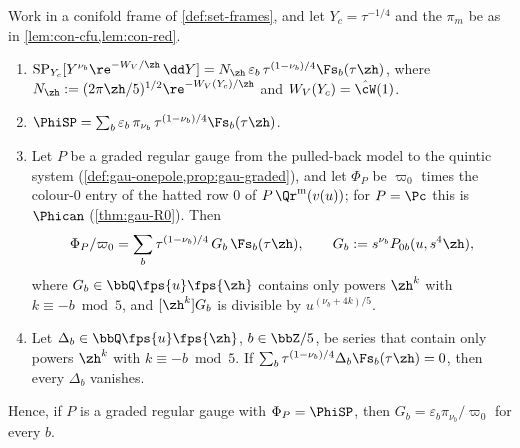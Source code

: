 \begin{lem}
\label{lem:con-id}
Work in a conifold frame of \cref{def:set-frames}, and let $Y_c=\tau^{-1/4}$ and the $\pi_m$ be as in \cref{lem:con-cfu,lem:con-red}.
\begin{enumerate}
\item[(a)] $\mathrm{SP}_{Y_c}[Y^{\nu_b}\re^{-W_V/\zh}\,\dd Y]=N_{\zh}\,\varepsilon_b\,\tau^{(1-\nu_b)/4}\Fs_b(\tau\zh)$, where $N_{\zh}:=(2\pi\zh/5)^{1/2}\re^{-W_V(Y_c)/\zh}$ and $W_V(Y_c)=\hat\cW(1)$.
\item[(b)] $\PhiSP=\sum_b\varepsilon_b\,\pi_{\nu_b}\,\tau^{(1-\nu_b)/4}\Fs_b(\tau\zh)$.
\item[(c)] Let $P$ be a graded regular gauge from the pulled-back model to the quintic system (\cref{def:gau-onepole,prop:gau-graded}), and let $\Phi_P$ be $\varpi_0$ times the colour-$0$ entry of the hatted row $0$ of $P\,\Qr^{\mathrm m}(v(u))$; for $P=\Pc$ this is $\Phican$ (\cref{thm:gau-R0}). Then
\[
\Phi_P/\varpi_0=\sum_b\tau^{(1-\nu_b)/4}\,G_b\,\Fs_b(\tau\zh),\qquad G_b:=s^{\nu_b}P_{0b}(u,s^4\zh),
\]
where $G_b\in\bbQ\fps{u}\fps{\zh}$ contains only powers $\zh^k$ with $k\equiv-b\bmod5$, and $[\zh^k]G_b$ is divisible by $u^{(\nu_b+4k)/5}$.
\item[(d)] Let $\Delta_b\in\bbQ\fps{u}\fps{\zh}$, $b\in\bbZ/5$, be series that contain only powers $\zh^k$ with $k\equiv-b\bmod5$. If $\sum_b\tau^{(1-\nu_b)/4}\Delta_b\Fs_b(\tau\zh)=0$, then every $\Delta_b$ vanishes.
\end{enumerate}
Hence, if $P$ is a graded regular gauge with $\Phi_P=\PhiSP$, then $G_b=\varepsilon_b\pi_{\nu_b}/\varpi_0$ for every $b$.
\end{lem}

